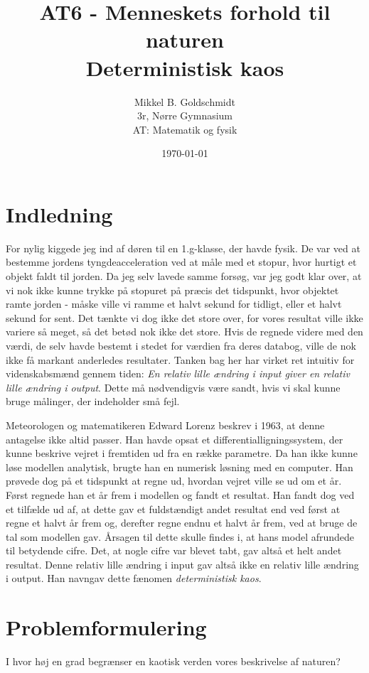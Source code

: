\documentclass[12pt,a4paper]{article}
\author{Mikkel B. Goldschmidt\\ 3r, Nørre Gymnasium \\ AT: Matematik og fysik}
\title{AT6 - Menneskets forhold til naturen \\ Deterministisk kaos}
\date{\today}
\theoremstyle{break}
\theoremstyle{nonumberplain}
\begin{document}
\maketitle

\section{Indledning} For nylig kiggede jeg ind af døren til en 1.g-klasse, der havde fysik. 
De var ved at bestemme jordens tyngdeacceleration ved at måle med et stopur, hvor hurtigt et objekt faldt til jorden. 
Da jeg selv lavede samme forsøg, var jeg godt klar over, at vi nok ikke kunne trykke på stopuret på præcis det tidspunkt, hvor objektet ramte jorden - måske ville vi ramme et halvt sekund for tidligt, eller et halvt sekund for sent. 
Det tænkte vi dog ikke det store over, for vores resultat ville ikke variere så meget, så det betød nok ikke det store. 
Hvis de regnede videre med den værdi, de selv havde bestemt i stedet for værdien fra deres databog, ville de nok ikke få markant anderledes resultater. 
Tanken bag her har virket ret intuitiv for videnskabsmænd gennem tiden: 
\textit{En relativ lille ændring i input giver en relativ lille ændring i output}. 
Dette må nødvendigvis være sandt, hvis vi skal kunne bruge målinger, der indeholder små fejl.

Meteorologen og matematikeren Edward Lorenz beskrev i 1963, at denne antagelse ikke altid passer. 
Han havde opsat et differentialligningssystem, der kunne beskrive vejret i fremtiden ud fra en række parametre. 
Da han ikke kunne løse modellen analytisk, brugte han en numerisk løsning med en computer. 
Han prøvede dog på et tidspunkt at regne ud, hvordan vejret ville se ud om et år. 
Først regnede han et år frem i modellen og fandt et resultat. 
Han fandt dog ved et tilfælde ud af, at dette gav et fuldstændigt andet resultat end ved først at regne et halvt år frem og, derefter  regne endnu et halvt år frem, ved at bruge de tal som modellen gav. 
Årsagen til dette skulle findes i, at hans model afrundede til betydende cifre. 
Det, at nogle cifre var blevet tabt, gav altså et helt andet resultat. 
Denne relativ lille ændring i input gav altså ikke en relativ lille ændring i output. 
Han navngav dette fænomen \textit{deterministisk kaos}.

\section{Problemformulering}
I hvor høj en grad begrænser en kaotisk verden vores beskrivelse af naturen?
\end{document}
